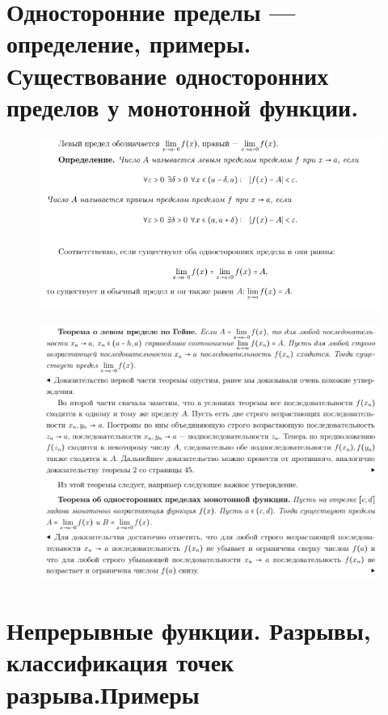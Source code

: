 \section{Односторонние пределы — определение, примеры. Существование односторонних пределов у монотонной функции.}

 \begin{figure}[h!]
\centering
\includegraphics[scale=0.65]{Pictures/27_1.png}
\end{figure}
 \begin{figure}[h!]
\centering
\includegraphics[scale=0.65]{Pictures/27_2.png}
\end{figure}
\newpage

\section{Непрерывные функции. Разрывы, классификация точек разрыва.Примеры}

